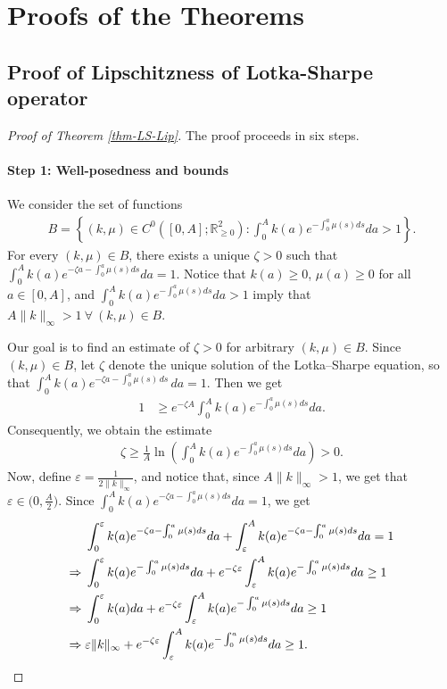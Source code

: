 \documentclass[journal,twoside,web]{ieeecolor}
\begin{document}
\section{Proofs of the Theorems}
\label{app:LS-Lipschitz}
\label{sec-proofs}

\subsection{Proof of Lipschitzness of Lotka-Sharpe operator}

\begin{proof}[Proof of Theorem \ref{thm-LS-Lip}]
The proof proceeds in six steps.
\paragraph*{Step 1: Well-posedness and bounds}
We consider the set of functions
\begin{align}
B = \left\{ (k,\mu) \in C^0\left([0,A];\mathbb{R}_{\geq 0}^2\right) :
\int_0^A k(a)e^{-\int_0^a \mu(s) ds} da > 1 \right\}. \label{eq:set_B}
\end{align}
For every $(k,\mu) \in B$, there exists a unique $\zeta>0$ such that $\int_0^A k(a)e^{-\zeta a - \int_0^a \mu(s) ds} da = 1$. 
Notice that $k(a)\ge 0$, $\mu(a)\ge 0$ for all $a \in [0,A]$, and
$\int_0^A k(a)e^{-\int_0^a \mu(s) ds} da > 1 $ imply that $A \|k\|_\infty > 1 \ \forall \ (k,\mu) \in B$.

\medskip
Our goal is to find an estimate of $\zeta>0$ for arbitrary $(k,\mu)\in B$.
Since $(k,\mu)\in B$, let $\zeta$ denote the unique solution of the Lotka–Sharpe equation, so that
$\int_0^A k(a)e^{-\zeta a-\int_0^a \mu(s)\,ds}\,da=1$. 
Then we get
\begin{align}
1 &\ge e^{-\zeta A} 
    \int_0^A k(a)e^{-\int_0^a \mu(s) ds} da.
\end{align}
Consequently, we obtain the estimate
\begin{align}
\zeta \ge \frac{1}{A} 
\ln \left(
\int_0^A k(a)e^{-\int_0^a \mu(s) ds} da
\right) > 0. \label{eq:zeta_estimate1}
\end{align}
Now, define $\varepsilon = \frac{1}{2 \|k\|_\infty}$, and notice that, since $A\|k\|_\infty > 1$, we get that $\varepsilon \in \Big(0, \frac{A}{2}\Big)$. 
Since $\int_0^A k(a)e^{-\zeta a - \int_0^a \mu(s) ds} da = 1$, we get
\begin{align}
&\int_0^\varepsilon k(a)e^{-\zeta a - \int_0^a \mu(s) ds} da
+ \int_\varepsilon^A k(a)e^{-\zeta a - \int_0^a \mu(s) ds} da = 1 \notag \\
\Rightarrow\;& 
\int_0^\varepsilon k(a)e^{-\int_0^a \mu(s) ds} da
+ e^{-\zeta\varepsilon} \int_\varepsilon^A k(a)e^{-\int_0^a \mu(s) ds} da \ge 1 \notag \\
\Rightarrow\;&
\int_0^\varepsilon k(a) da 
+ e^{-\zeta \varepsilon} \int_\varepsilon^A k(a)e^{-\int_0^a \mu(s) ds} da \ge 1 \notag \\
\Rightarrow\;&
\varepsilon \|k\|_\infty 
+ e^{-\zeta\varepsilon} \int_\varepsilon^A k(a)e^{-\int_0^a \mu(s) ds} da \ge 1.
\end{align}


\end{proof}
\end{document}
